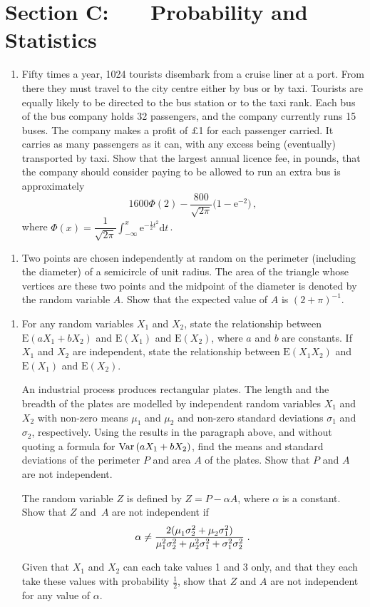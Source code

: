 \documentclass[a4, 11pt]{report}
\newlength{\qspace}
\newcounter{qnumber}
\newenvironment{question}%
 {\vspace{\qspace}
  \begin{enumerate}[\bfseries 1\quad][10]%
    \setcounter{enumi}{\value{qnumber}}%
    \item%
 }
{
  \end{enumerate}
  \filbreak
  \stepcounter{qnumber}
 }
\def\d{{\mathrm d}}
\def\e{{\mathrm e}}
\def\E{{\mathrm E}}
\def\var{{\rm Var}\,}
\begin{document}
	
	\newpage
\section*{Section C: \ \ \ Probability and Statistics}


\begin{question}
Fifty times a year, 1024 tourists disembark from a cruise liner at
a port.
 From there they must travel to the  city centre either by bus or by taxi.
Tourists  are equally likely to be directed to the bus station
or to the taxi rank. Each bus of the bus company holds 32 passengers, and the
company currently runs 15 buses. The company makes a profit of $\pounds$1 
for each passenger carried. It carries as many passengers as it can, with
any excess being (eventually) transported by taxi. Show that  the 
largest annual licence fee, in pounds, that  the company should consider paying to be allowed
to run an extra bus is approximately
\[
1600 \Phi(2) -  \frac{800}{\sqrt{2\pi}}\big(1- \e^{-2}\big)\,,
\]
where  
$\displaystyle \Phi(x) =\dfrac1{\sqrt{2\pi}} \int_{-\infty}^x \e^{-\frac12t^2}\d t\,$.

\end{question}

\begin{question}
Two points are chosen independently at random on the perimeter
(including the diameter) of a semicircle of unit radius.
The area of the triangle whose vertices are these
 two points  and the midpoint of the diameter is denoted by the random
variable $A$. Show that the expected value of $A$ is $(2+\pi)^{-1}$.
\end{question}

\begin{question}
For any random variables $X_1$ and $X_2$, state the relationship between
$\E(aX_1+bX_2)$ and $\E(X_1)$ and $\E(X_2)$, where $a$ and $b$ are constants. 
If $X_1$ and $X_2$ are independent,
state the relationship between $\E(X_1X_2)$ and $\E(X_1)$ and $\E(X_2)$.

An industrial process produces rectangular plates.
The length and the breadth of the plates are modelled by
independent random
variables  $X_1$ and $X_2$
with  non-zero means  $\mu_1$ and  $\mu_2$ 
and   non-zero
standard deviations $\sigma_1$ and $\sigma_2$, respectively.
Using the results in the paragraph above, and without quoting a
formula
for $\var(aX_1+bX_2)$, 
find the means and standard deviations of the
perimeter $P$ and area $A$ of the plates. 
Show that $P$ and $A$ are not independent.

The random variable $Z$ is defined by  $Z=P-\alpha A$, where $\alpha $ is a 
constant. Show that $Z$ and~$A$ are not independent if 
\[
\alpha \ne \dfrac{2(\mu_1^{\vphantom2} \sigma_2^2 +\mu_2^{\vphantom2}\sigma_1^2)}
{ \mu_1^2 \sigma_2^2 +\mu_2^2\sigma_1^2 + \sigma_1^2\sigma_2^2 }
\;.
\]

Given that $X_1$ and $X_2$ can each take values 1 and 3 only, and that
they each take these values with probability $\frac 12$, 
 show that $Z$ and $A$ are not independent for any value of $\alpha$.
\end{question}
	
\end{document}
